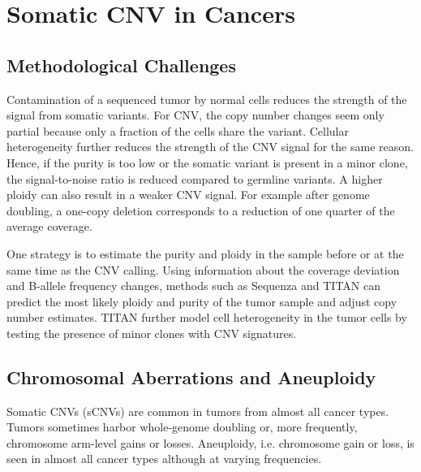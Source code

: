 \section{Somatic CNV in Cancers}

\subsection{Methodological Challenges}

Contamination of a sequenced tumor by normal cells reduces the strength of the signal from somatic variants.
For CNV, the copy number changes seem only partial because only a fraction of the cells share the variant.
Cellular heterogeneity further reduces the strength of the CNV signal for the same reason.
Hence, if the purity is too low or the somatic variant is present in a minor clone, the signal-to-noise ratio is reduced compared to germline variants.
A higher ploidy can also result in a weaker CNV signal.
For example after genome doubling, a one-copy deletion corresponds to a reduction of one quarter of the average coverage.

One strategy is to estimate the purity and ploidy in the sample before or at the same time as the CNV calling.
Using information about the coverage deviation and B-allele frequency changes, methods such as {\sf Sequenza}\cite{Favero2015} and {\sf TITAN}\cite{Ha2014} can predict the most likely ploidy and purity of the tumor sample and adjust copy number estimates.
{\sf TITAN} further model cell heterogeneity in the tumor cells by testing the presence of minor clones with CNV signatures.


\subsection{Chromosomal Aberrations and Aneuploidy}
\label{sec:canceraneu}
Somatic CNVs (sCNVs) are common in tumors from almost all cancer types\cite{Beroukhim2010,Zack2013}. 
Tumors sometimes harbor whole-genome doubling or, more frequently, chromosome arm-level gains or losses.
Aneuploidy, i.e. chromosome gain or loss, is seen in almost all cancer types although at varying frequencies\cite{Zack2013,Baudis2007,Kim2013b}.

